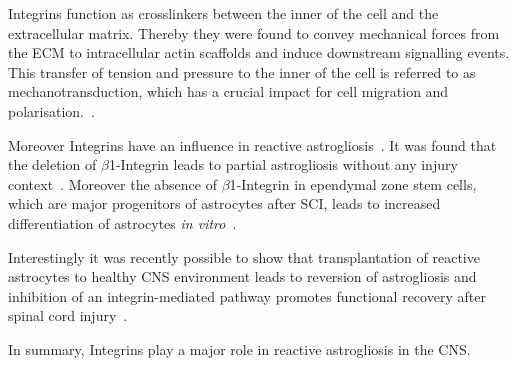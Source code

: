 \documentclass[a4paper,11pt,bibtotocnumbered]{article}
\begin{document}
Integrins function as crosslinkers between the inner of the cell and the extracellular matrix. Thereby they were found to convey mechanical forces from the ECM to intracellular actin scaffolds and induce downstream signalling events. This transfer of tension and pressure to the inner of the cell is referred to as mechanotransduction, which has a crucial impact for cell migration and polarisation.~\cite{Sun2016}.

Moreover Integrins have an influence in reactive astrogliosis~\cite{Robel2009, North2015, Hara2017}.
It was found that the deletion of $\beta$1-Integrin leads to partial astrogliosis without any injury context~\cite{Robel2009}. Moreover the absence of $\beta$1-Integrin in ependymal zone stem cells, which are major progenitors of astrocytes after SCI, leads to increased differentiation of astrocytes \textit{in vitro}~\cite{North2015}.

Interestingly it was recently possible to show that transplantation of reactive astrocytes to healthy CNS environment leads to reversion of astrogliosis and inhibition of an integrin-mediated pathway promotes functional recovery after spinal cord injury~\cite{Hara2017}.

In summary, Integrins play a major role in reactive astrogliosis in the CNS.








\end{document}
